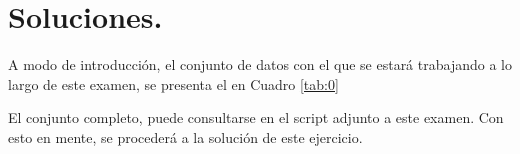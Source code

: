 \documentclass[10.5pt,notitlepage]{article}
\theoremstyle{plain}
\begin{document}
\section{Soluciones.}
A modo de introducción, el conjunto de datos con el que se estará trabajando a lo largo de este examen, se presenta el en Cuadro \ref{tab:0}
\begin{table}[H]
        \centering
        \caption{Datos del nivel global medio del mar, GMSL por sus siglas en ingles y, desviación estándar del cambio medido entre observaciones, abreviaba por sus siglas en inglés como \(STD\). Observaciones, hechas desde 1993 hasta 2021.}
        \label{tab:0}
\end{table}
El conjunto completo, puede consultarse en el script adjunto a este examen. Con esto en mente, se procederá a la solución de este ejercicio.
\end{document}
